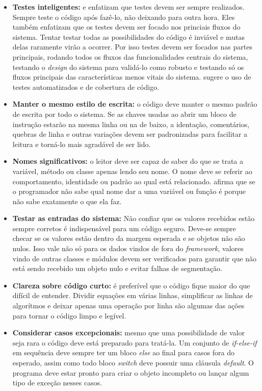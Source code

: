 \begin{itemize}
  \item \textbf{Testes inteligentes:} \cite{Goodliffe2007} e \cite{McConnel2004} enfatizam que testes devem ser sempre realizados. Sempre teste o código após fazê-lo, não deixando para outra hora. Eles também enfatizam que os testes devem ser focado nos princiais fluxos do sistema. Tentar testar todas as possibilidades do código é inviável e mutas delas raramente virão a ocorrer. Por isso testes devem ser focados nas partes principais, rodando todos os fluxos das funcionalidades centrais do sistema, testando o \textit{design} do sistema para validá-lo como robusto e testando só os fluxos principais das características menos vitais do sistema. \cite{McConnel2004} sugere o uso de testes automatizados e de cobertura de código.
  \item \textbf{Manter o mesmo estilo de escrita:} o código deve manter o mesmo padrão de escrita por todo o sistema. Se as chaves usadas ao abrir um bloco de instrução estarão na mesma linha ou na de baixo, a identação, comentários, quebras de linha e outras variações devem ser padronizadas para facilitar a leitura e torná-lo mais agradável de ser lido.
  \item \textbf{Nomes significativos:} o leitor deve ser capaz de saber do que se trata a variável, método ou classe apenas lendo seu nome. O nome deve se referir ao comportamento, identidade ou padrão ao qual está relacionado. \cite{Goodliffe2007} afirma que se o programador não sabe qual nome dar a uma variável ou função é porque não sabe exatamente o que ela faz.
  \item \textbf{Testar as entradas do sistema:} Não confiar que os valores recebidos estão sempre corretos é indispensável para um código seguro. Deve-se sempre checar se os valores estão dentro da margem esperada e se objetos não são nulos. Isso vale não só para os dados vindos de fora do \textit{framework}, valores vindo de outras classes e módulos devem ser verificados para garantir que não está sendo recebido um objeto nulo e evitar falhas de segmentação.
  \item \textbf{Clareza sobre código curto:} é preferível que o código fique maior do que difícil de entender. Dividir equações em várias linhas, simplificar as linhas de algorítmos e deixar apenas uma operação por linha são algumas das ações para tornar o código limpo e legível.
  \item \textbf{Considerar casos excepcionais:} mesmo que uma possibilidade de valor seja rara o código deve está preparado para tratá-la. Um conjunto de \textit{if-else-if} em sequência deve sempre ter um bloco \textit{else} ao final para casos fora do esperado, assim como todo bloco \textit{switch} deve possuir uma cláusula \textit{default}. O programa deve estar pronto para criar o objeto incompleto ou lançar algum tipo de exceção nesses casos.

\end{itemize}
